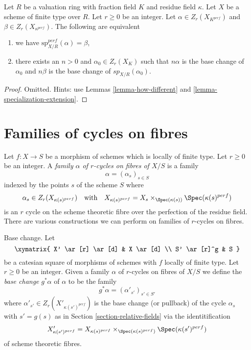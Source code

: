 \begin{lemma}
\label{lemma-specialization-perfect}
Let $R$ be a valuation ring with fraction field $K$ and residue field $\kappa$.
Let $X$ be a scheme of finite type over $R$. Let $r \geq 0$ be an integer.
Let $\alpha \in Z_r(X_{K^{perf}})$ and $\beta \in Z_r(X_{\kappa^{perf}})$.
The following are equivalent
\begin{enumerate}
\item we have $\text{sp}_{X/R}^{perf}(\alpha) = \beta$,
\item there exists an $n > 0$ and $\alpha_0 \in Z_r(X_K)$
such that $n \alpha$ is the base change of $\alpha_0$
and $n \beta$ is the base change of $sp_{X/R}(\alpha_0)$.
\end{enumerate}
\end{lemma}

\begin{proof}
Omitted. Hints: use Lemmas \ref{lemma-how-different} and
\ref{lemma-specialization-extension}.
\end{proof}









\section{Families of cycles on fibres}
\label{section-cycles-fibres}

\noindent
Let $f : X \to S$ be a morphism of schemes which is locally of finite type.
Let $r \geq 0$ be an integer. A
{\it family $\alpha$ of $r$-cycles on fibres of $X/S$} is a family
$$
\alpha = (\alpha_s)_{s \in S}
$$
indexed by the points $s$ of the scheme $S$ where
$$
\alpha_s \in Z_r(X_{\kappa(s)^{perf}})
\quad\text{with}\quad
X_{\kappa(s)^{perf}} = X_s \times_{\Spec(\kappa(s))} \Spec(\kappa(s)^{perf})
$$
is an $r$ cycle on the scheme theoretic fibre over the perfection of
the residue field. There are various constructions we can perform on
families of $r$-cycles on fibres.

\medskip\noindent
Base change. Let
$$
\xymatrix{
X' \ar[r] \ar[d] & X \ar[d] \\
S' \ar[r]^g & S
}
$$
be a catesian square of morphisms of schemes with $f$ locally of finite type.
Let $r \geq 0$ be an integer. Given a family $\alpha$ of $r$-cycles on
fibres of $X/S$ we define the {\it base change} $g^*\alpha$ of $\alpha$
to be the family
$$
g^*\alpha = (\alpha'_{s'})_{s' \in S'}
$$
where $\alpha'_{s'} \in Z_r(X'_{\kappa(s')^{perf}})$ is the base change
(or pullback) of the cycle $\alpha_s$ with $s' = g(s)$ as in
Section \ref{section-relative-fields} via the identitification
$$
X'_{\kappa(s')^{perf}} =
X_{\kappa(s)^{perf}} \times_{\Spec(\kappa(s)^{perf})} \Spec(\kappa(s')^{perf})
$$
of scheme theoretic fibres.

